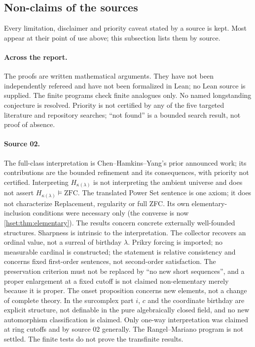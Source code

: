 \documentclass[11pt,letterpaper]{article}
\theoremstyle{definition}
\theoremstyle{remark}
\newcommand{\ZFC}{\mathrm{ZFC}}
\begin{document}
\subsection{Non-claims of the sources}
\label{hset:sub:nonclaims}

Every limitation, disclaimer and priority caveat stated by a source is kept.
Most appear at their point of use above; this subsection lists them by source.

\paragraph{Across the report.} The proofs are written mathematical arguments.
They have not been independently refereed and have not been formalized in Lean;
no Lean source is supplied. The finite programs check finite analogues only. No
named longstanding conjecture is resolved. Priority is not certified by any of
the five targeted literature and repository searches; ``not found'' is a
bounded search result, not proof of absence.

\paragraph{Source 02.}
The full-class interpretation is Chen--Hamkins--Yang's prior announced work; its
contributions are the bounded refinement and its consequences, with priority not
certified. Interpreting $H_{\kappa(\lambda)}$ is not interpreting the ambient
universe and does not assert $H_{\kappa(\lambda)}\models\ZFC$. The translated
Power Set sentence is one axiom; it does not characterize Replacement,
regularity or full ZFC. Its own elementary-inclusion conditions were necessary
only (the converse is now \cref{hset:thm:elementary}). The results concern
concrete externally well-founded structures. Sharpness is intrinsic to the
interpretation. The collector recovers an ordinal value, not a surreal of
birthday $\lambda$. Prikry forcing is imported; no measurable cardinal is
constructed; the statement is relative consistency and concerns fixed
first-order sentences, not second-order satisfaction. The preservation criterion
must not be replaced by ``no new short sequences'', and a proper enlargement at
a fixed cutoff is not claimed non-elementary merely because it is proper. The
onset proposition concerns new elements, not a change of complete theory. In
the surcomplex part $i$, $c$ and the coordinate birthday are explicit structure,
not definable in the pure algebraically closed field, and no new automorphism
classification is claimed. Only one-way interpretation was claimed at ring
cutoffs and by source 02 generally. The Rangel--Mariano program is not settled.
The finite tests do not prove the transfinite results.
\end{document}

